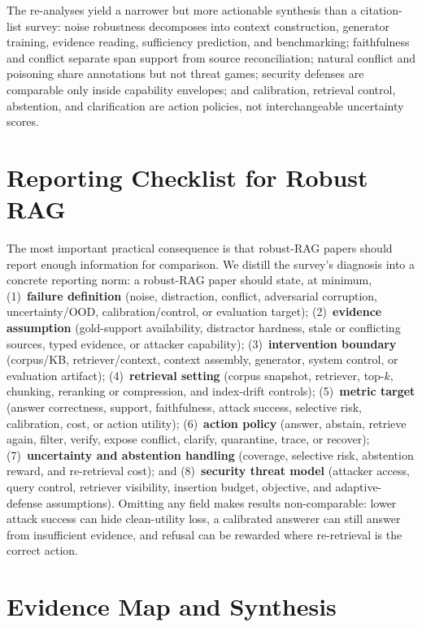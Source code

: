 \documentclass[runningheads]{llncs}
\begin{document}


The re-analyses yield a narrower but more actionable synthesis than a citation-list survey: noise robustness decomposes into context construction, generator training, evidence reading, sufficiency prediction, and benchmarking; faithfulness and conflict separate span support from source reconciliation; natural conflict and poisoning share annotations but not threat games; security defenses are comparable only inside capability envelopes; and calibration, retrieval control, abstention, and clarification are action policies, not interchangeable uncertainty scores.

\section{Reporting Checklist for Robust RAG}

The most important practical consequence is that robust-RAG papers should report enough information for comparison. We distill the survey's diagnosis into a concrete reporting norm: a robust-RAG paper should state, at minimum, (1)~\textbf{failure definition} (noise, distraction, conflict, adversarial corruption, uncertainty/OOD, calibration/control, or evaluation target); (2)~\textbf{evidence assumption} (gold-support availability, distractor hardness, stale or conflicting sources, typed evidence, or attacker capability); (3)~\textbf{intervention boundary} (corpus/KB, retriever/context, context assembly, generator, system control, or evaluation artifact); (4)~\textbf{retrieval setting} (corpus snapshot, retriever, top-$k$, chunking, reranking or compression, and index-drift controls); (5)~\textbf{metric target} (answer correctness, support, faithfulness, attack success, selective risk, calibration, cost, or action utility); (6)~\textbf{action policy} (answer, abstain, retrieve again, filter, verify, expose conflict, clarify, quarantine, trace, or recover); (7)~\textbf{uncertainty and abstention handling} (coverage, selective risk, abstention reward, and re-retrieval cost); and (8)~\textbf{security threat model} (attacker access, query control, retriever visibility, insertion budget, objective, and adaptive-defense assumptions). Omitting any field makes results non-comparable: lower attack success can hide clean-utility loss, a calibrated answerer can still answer from insufficient evidence, and refusal can be rewarded where re-retrieval is the correct action.

\section{Evidence Map and Synthesis}
\label{sec:evidence-map}
\end{document}
